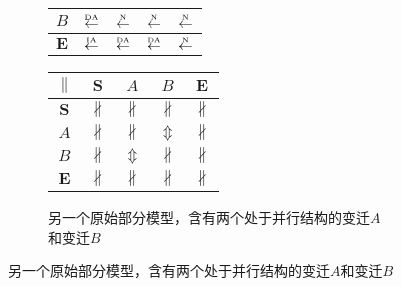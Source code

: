 \begin{figure}[htbp]
\begin{subfigure}{1\textwidth}
\begin{minipage}[b]{0.3\textwidth}
\begin{tabular}{|c|c|c|c|c|}
        $B$ & $\overset{\text{\tiny{DA}}}{\leftarrow}$ & $\overset{\text{\tiny{N}}}{\leftarrow}$ & $\overset{\text{\tiny{N}}}{\leftarrow}$ & $\overset{\text{\tiny{N}}}{\leftarrow}$\\ \hline
        $\bm{E}$ & $\overset{\text{\tiny{IA}}}{\leftarrow}$ & $\overset{\text{\tiny{DA}}}{\leftarrow}$ & $\overset{\text{\tiny{DA}}}{\leftarrow}$ & $\overset{\text{\tiny{N}}}{\leftarrow}$\\ \hline
      \end{tabular}
    \end{minipage}
    \begin{minipage}[b]{0.3\textwidth}
      \vspace{1em}
      \centering
      \begin{tabular}{|c|c|c|c|c|} \hline
        $\parallel$ & $\bm{S}$ & $A$ & $B$ & $\bm{E}$\\ \hline
        $\bm{S}$ & $\nparallel$ & $\nparallel$ & $\nparallel$ & $\nparallel$\\ \hline
        $A$ & $\nparallel$ & $\nparallel$ & $\Updownarrow$ & $\nparallel$\\ \hline
        $B$ & $\nparallel$ & $\Updownarrow$ & $\nparallel$ & $\nparallel$\\ \hline
        $\bm{E}$ & $\nparallel$ & $\nparallel$ & $\nparallel$ & $\nparallel$\\ \hline
      \end{tabular}
    \end{minipage}
    \caption{另一个原始部分模型，含有两个处于并行结构的变迁$A$和变迁$B$}
    \label{fig:uniqueness_3_e}
  \end{subfigure}


\end{figure}
